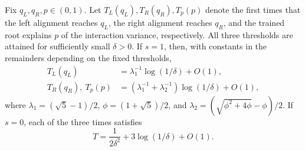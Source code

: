 \begin{theorem}
\label{thm:untied}
Fix $q_L,q_R,p\in(0,1)$. Let $T_L(q_L),T_R(q_R),T_p(p)$ denote the
first times that the left alignment reaches $q_L$, the right alignment
reaches $q_R$, and the trained root explains $p$ of the interaction
variance, respectively. All three thresholds are attained for sufficiently
small $\delta>0$. If $s=1$, then, with constants in the remainders
depending on the fixed thresholds,
\begin{align*}
 T_L(q_L)&=\lambda_1^{-1}\log(1/\delta)+O(1),\\
 T_R(q_R),\ T_p(p)&=(\lambda_1^{-1}+\lambda_2^{-1})\log(1/\delta)+O(1),
\end{align*}
where $\lambda_1=(\sqrt5-1)/2$,
$\phi=(1+\sqrt5)/2$, and
$\lambda_2=(\sqrt{\phi^2+4\phi}-\phi)/2$.
If $s=0$, each of the three times satisfies
\[
 T=\frac{1}{2\delta^2}+3\log(1/\delta)+O(1).
\]
\end{theorem}

